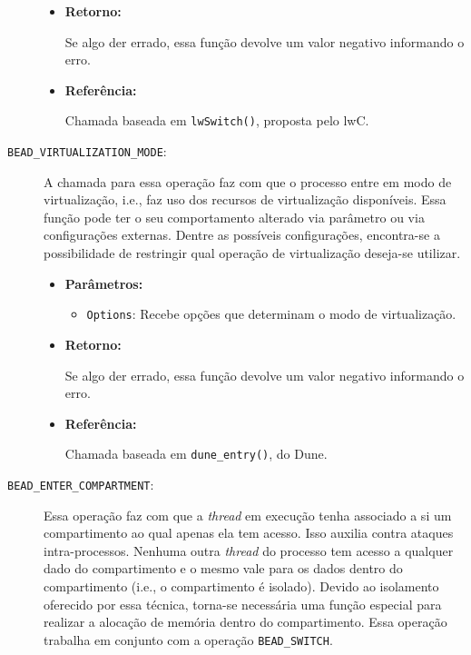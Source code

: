 \begin{description}
\begin{itemize}
    \item \textbf{Retorno:}

Se algo der errado, essa função devolve um valor negativo informando o erro.

    \item \textbf{Referência:}

Chamada baseada em \texttt{lwSwitch()}, proposta pelo lwC.

  \end{itemize}

  \item [\texttt{BEAD\_VIRTUALIZATION\_MODE}:]

A chamada para essa operação faz com que o processo entre em modo de
virtualização, i.e., faz uso dos recursos de virtualização disponíveis. Essa função pode ter o seu comportamento alterado via parâmetro ou via
configurações externas. Dentre as possíveis configurações, encontra-se a
possibilidade de restringir qual operação de virtualização deseja-se utilizar.

  \begin{itemize}
    \item \textbf{Parâmetros:}

    \begin{itemize}
    \item \texttt{Options}: Recebe opções que determinam o modo de virtualização.
    \end{itemize}

    \item \textbf{Retorno:}

Se algo der errado, essa função devolve um valor negativo informando o erro.

    \item \textbf{Referência:}

Chamada baseada em \texttt{dune\_entry()}, do Dune.

  \end{itemize}

  \item [\texttt{BEAD\_ENTER\_COMPARTMENT}:]

Essa operação faz com que a \emph{thread} em execução tenha associado a si um
compartimento ao qual apenas ela tem acesso. Isso auxilia contra
ataques intra-processos. Nenhuma outra \emph{thread} do processo tem acesso a qualquer
dado do compartimento e o mesmo vale para os dados dentro do compartimento
(i.e., o compartimento é isolado). Devido ao isolamento oferecido por essa
técnica, torna-se necessária uma função especial para realizar a alocação de memória
dentro do compartimento. Essa operação trabalha em conjunto com a operação
\texttt{BEAD\_SWITCH}.


\end{description}
